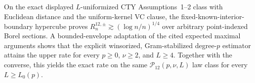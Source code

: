 On the exact displayed \(L\)-uniformized CTY Assumptions~1--2 class with Euclidean distance and the uniform-kernel VC clause, the fixed-known-interior-boundary hypercube proves \(R_n^{12,\pm}\gtrsim(\log n/n)^{1/4}\) over arbitrary point-indexed Borel sections.  A bounded-envelope adaptation of the cited expected maximal arguments shows that the explicit winsorized, Gram-stabilized degree-\(p\) estimator attains the upper rate for every \(p\geq0\), \(\nu\geq2\), and \(L\geq4\).  Together with the converse, this yields the exact rate on the same \(\mathcal P_{12}(p,\nu,L)\) law class for every \(L\geq L_0(p)\).